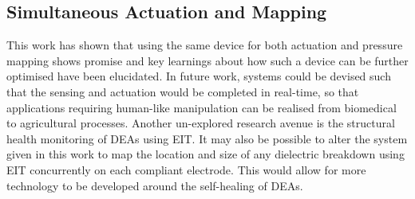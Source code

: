 

 	\subsection{Simultaneous Actuation and Mapping}
	This work has shown that using the same device for both actuation and pressure mapping shows promise and key learnings about how such a device can be further optimised have been elucidated. In future work, systems could be devised such that the sensing and actuation would be completed in real-time, so that applications requiring human-like manipulation can be realised from biomedical to agricultural processes. Another un-explored research avenue is the structural health monitoring of DEAs using EIT. It may also be possible to alter the system given in this work to map the location and size of any dielectric breakdown using EIT concurrently on each compliant electrode. This would allow for more technology to be developed around the self-healing of DEAs.
	
